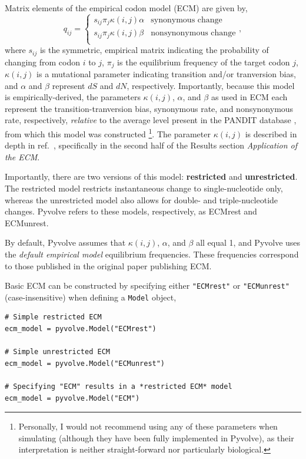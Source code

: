 \documentclass{article}
\newcommand{\code}[1]{\texttt{\small{#1}}}
\begin{document}
Matrix elements of the empirical codon model (ECM) \citep{ECM} are given by,
\begin{equation}\label{eq:ecmrest}
q_{ij} = \left\{ 
\begin{array}{rl}
s_{ij} \pi_j \kappa(i,j) \alpha      &\text{synonymous change} \\
s_{ij} \pi_j \kappa(i,j) \beta       &\text{nonsynonymous change} \\
\end{array} \right.,
\end{equation}
where $s_{ij}$ is the symmetric, empirical matrix indicating the probability of changing from codon $i$ to $j$, $\pi_j$ is the equilibrium frequency of the target codon $j$, $\kappa(i,j)$ is a mutational parameter indicating transition and/or tranversion bias, and $\alpha$ and $\beta$ represent $dS$ and $dN$, respectively. Importantly, because this model is empirically-derived, the parameters $\kappa(i,j)$, $\alpha$, and $\beta$ as used in ECM each represent the transition-tranversion bias, synonymous rate, and nonsynonymous rate, respectively, \emph{relative} to the average level present in the PANDIT database \citep{PANDIT2006}, from which this model was constructed \footnote{Personally, I would not recommend using any of these parameters when simulating (although they have been fully implemented in Pyvolve), as their interpretation is neither straight-forward nor particularly biological.}. The parameter $\kappa(i,j)$ is described in depth in ref.\ \citep{ECM}, specifically in the second half of the Results section \emph{Application of the ECM}.

Importantly, there are two versions of this model: \textbf{restricted} and \textbf{unrestricted}. The restricted model restricts instantaneous change to single-nucleotide only, whereas the unrestricted model also allows for double- and triple-nucleotide changes. Pyvolve refers to these models, respectively, as ECMrest and ECMunrest. 


By default, Pyvolve assumes that $\kappa(i,j)$, $\alpha$, and $\beta$ all equal 1, and Pyvolve uses the \emph{default empirical model} equilibrium frequencies. These frequencies correspond to those published in the original paper publishing ECM.

Basic ECM can be constructed by specifying either \code{"ECMrest"} or \code{"ECMunrest"} (case-insensitive) when defining a \code{Model} object,
\begin{lstlisting}
# Simple restricted ECM
ecm_model = pyvolve.Model("ECMrest")

# Simple unrestricted ECM
ecm_model = pyvolve.Model("ECMunrest")

# Specifying "ECM" results in a *restricted ECM* model
ecm_model = pyvolve.Model("ECM")
\end{lstlisting}
\end{document}
